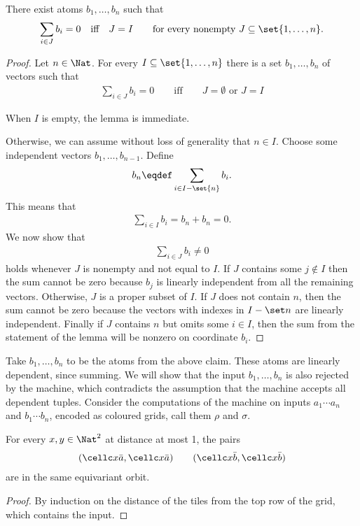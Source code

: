 \begin{claim}\label{lem:cheat} There exist atoms $b_1,\ldots,b_n$ such that
	\begin{align*}
		\sum_{i \in J} b_i = 0 \quad \mbox{iff} \quad J=I \qquad \text{for every nonempty $J \subseteq \set{1,\ldots,n}$.}
	\end{align*}
\end{claim}
\begin{proof}

	Let $n \in \Nat$.
	For every $I \subseteq \set{1,\ldots,n}$ there is a set $b_1,\ldots,b_n$ of vectors such that
\begin{align*}
	\sum_{i \in J} b_i = 0 \qquad \mbox{iff} \qquad J=\emptyset \mbox{ or }J=I
\end{align*}


	When $I$ is empty, the lemma is immediate. 
	
	
Otherwise,	we can assume without loss of generality that $n \in I$.	
	Choose some independent vectors $b_1,\ldots,b_{n-1}$. Define 
	\begin{align*}
		b_n \eqdef \sum_{i \in I-\set{n}} b_i.
	\end{align*}
	This means that 
	\begin{align*}
		\sum_{i \in I} b_i = b_n + b_n = 0.
	\end{align*}
	We now show that 
	\begin{align*}
		\sum_{i \in J} b_i \neq 0 
	\end{align*}
	holds whenever $J$ is nonempty and not equal to $I$.
	If $J$ contains some $j \not \in I$ then the sum cannot be zero because $b_j$ is linearly independent from all the remaining vectors. Otherwise, $J$ is a proper subset of $I$. If $J$ does not contain $n$, then the sum cannot be zero because the vectors with indexes in $I - \set n$ are linearly independent. Finally if $J$ contains $n$ but omits some $i \in I$, then the sum from the statement of the lemma will be nonzero on coordinate $b_i$.
\end{proof}

Take $b_1,\ldots,b_n$ to be the atoms from the above claim. These atoms are linearly dependent, since summing. We will show that the input $b_1,\ldots,b_n$ is also rejected by the machine, which contradicts the assumption that the machine accepts all dependent tuples. 
Consider the computations of the machine on inputs $a_1 \cdots a_n$ and $b_1 \cdots b_n$, encoded as coloured grids, call them $\rho$ and $\sigma$. 
\begin{claim}
	For every $x,y \in \Nat^2$ at distance at most 1, the pairs 
	\begin{align*}
		(\cellc x {\bar a}, \cellc x {\bar a}) \qquad (\cellc x {\bar b}, \cellc x {\bar b}) 		\end{align*}
	are in the same equivariant orbit.
\end{claim}
\begin{proof}
	By induction on the distance of the tiles from the top row of the grid, which contains the input.
\end{proof}

